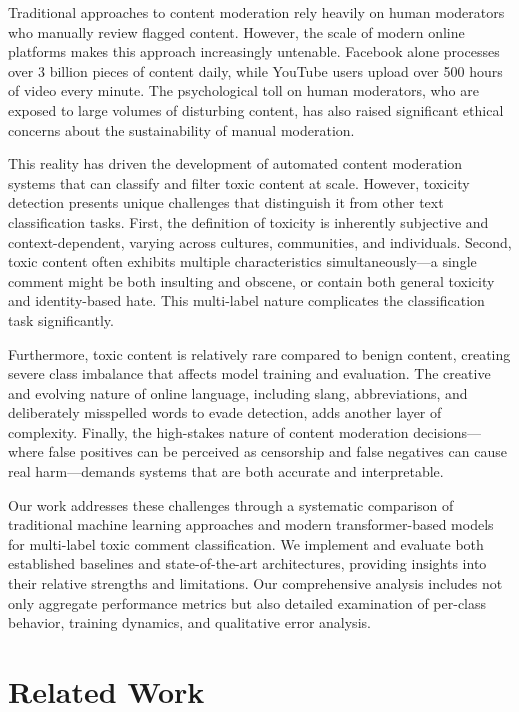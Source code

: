 \documentclass[11pt]{article}
\begin{document}
Traditional approaches to content moderation rely heavily on human moderators who manually review flagged content. However, the scale of modern online platforms makes this approach increasingly untenable. Facebook alone processes over 3 billion pieces of content daily, while YouTube users upload over 500 hours of video every minute. The psychological toll on human moderators, who are exposed to large volumes of disturbing content, has also raised significant ethical concerns about the sustainability of manual moderation.

This reality has driven the development of automated content moderation systems that can classify and filter toxic content at scale. However, toxicity detection presents unique challenges that distinguish it from other text classification tasks. First, the definition of toxicity is inherently subjective and context-dependent, varying across cultures, communities, and individuals. Second, toxic content often exhibits multiple characteristics simultaneously—a single comment might be both insulting and obscene, or contain both general toxicity and identity-based hate. This multi-label nature complicates the classification task significantly.

Furthermore, toxic content is relatively rare compared to benign content, creating severe class imbalance that affects model training and evaluation. The creative and evolving nature of online language, including slang, abbreviations, and deliberately misspelled words to evade detection, adds another layer of complexity. Finally, the high-stakes nature of content moderation decisions—where false positives can be perceived as censorship and false negatives can cause real harm—demands systems that are both accurate and interpretable.

Our work addresses these challenges through a systematic comparison of traditional machine learning approaches and modern transformer-based models for multi-label toxic comment classification. We implement and evaluate both established baselines and state-of-the-art architectures, providing insights into their relative strengths and limitations. Our comprehensive analysis includes not only aggregate performance metrics but also detailed examination of per-class behavior, training dynamics, and qualitative error analysis.

\section{Related Work}
\end{document}
